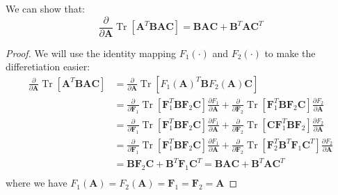 \begin{proposition}
    We can show that:
    \begin{equation*}
        \frac{\partial}{\partial \boldsymbol A}\operatorname{Tr}[\boldsymbol A^T\boldsymbol B\boldsymbol A\boldsymbol C] = \boldsymbol B\boldsymbol A\boldsymbol C + \boldsymbol B^T\boldsymbol A\boldsymbol C^T
    \end{equation*}
\end{proposition}
\begin{proof}
    We will use the identity mapping $F_1(\cdot)$ and $F_2(\cdot)$ to make the differetiation easier:
    \begin{equation*}
    \begin{aligned}
        \frac{\partial}{\partial \boldsymbol A}\operatorname{Tr}[\boldsymbol A^T\boldsymbol B\boldsymbol A\boldsymbol C] &= \frac{\partial}{\partial \boldsymbol A}\operatorname{Tr}[F_1(\boldsymbol A)^T\boldsymbol BF_2(\boldsymbol A)\boldsymbol C]  \\
        &= \frac{\partial}{\partial \boldsymbol F_1}\operatorname{Tr}[\boldsymbol F_1^T\boldsymbol B\boldsymbol F_2\boldsymbol C]\frac{\partial F_1}{\partial \boldsymbol A} + \frac{\partial}{\partial \boldsymbol F_2}\operatorname{Tr}[\boldsymbol F_1^T\boldsymbol B\boldsymbol F_2\boldsymbol C]\frac{\partial F_2}{\partial \boldsymbol A} \\
        &= \frac{\partial}{\partial \boldsymbol F_1}\operatorname{Tr}[\boldsymbol F_1^T\boldsymbol B\boldsymbol F_2\boldsymbol C]\frac{\partial F_1}{\partial \boldsymbol A} + \frac{\partial}{\partial \boldsymbol F_2}\operatorname{Tr}[\boldsymbol C\boldsymbol F_1^T\boldsymbol B\boldsymbol F_2]\frac{\partial F_2}{\partial \boldsymbol A} \\
        &= \frac{\partial}{\partial \boldsymbol F_1}\operatorname{Tr}[\boldsymbol F_1^T\boldsymbol B\boldsymbol F_2\boldsymbol C]\frac{\partial F_1}{\partial \boldsymbol A} + \frac{\partial}{\partial \boldsymbol F_2}\operatorname{Tr}[\boldsymbol F_2^T\boldsymbol B^T \boldsymbol F_1\boldsymbol C^T]\frac{\partial F_2}{\partial \boldsymbol A} \\
        &= \boldsymbol B\boldsymbol F_2\boldsymbol C + \boldsymbol B^T\boldsymbol F_1\boldsymbol C^T = \boldsymbol B\boldsymbol A\boldsymbol C + \boldsymbol B^T\boldsymbol A\boldsymbol C^T \\
    \end{aligned}
    \end{equation*}
    where we have $F_1(\boldsymbol A) = F_2(\boldsymbol A) = \boldsymbol F_1 = \boldsymbol F_2 = \boldsymbol A$
\end{proof}

